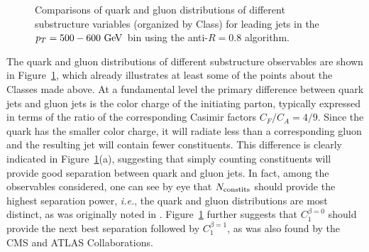 \begin{figure}
\caption{Comparisons of quark and gluon distributions of different substructure variables (organized by Class) for leading jets in the 
$\pt=500-600 \GeV$ bin using the anti-\kT $R=0.8$ algorithm. }
\label{fig:qg_pt500_subst_AKt_R08}
\end{figure}

The quark and gluon distributions of different substructure observables
are shown in Figure~\ref{fig:qg_pt500_subst_AKt_R08}, which already illustrates at least some of the points about the Classes made above. 
At a fundamental level the primary difference between quark jets and gluon jets is the color charge of the initiating parton, typically expressed in terms of the
ratio of the corresponding Casimir factors $C_F/C_A = 4/9$.  Since the quark has the smaller color charge, it will radiate less than a corresponding
gluon and the resulting jet will contain fewer constituents. This difference is clearly indicated in Figure~\ref{fig:qg_pt500_subst_AKt_R08}(a), 
suggesting that simply counting constituents will provide good separation between quark and gluon jets.  In fact, among the observables
considered, one can see by eye that $N_{\rm constits}$ should provide the highest separation
power, \textit{i.e.}, the quark and gluon distributions are most distinct, as was originally noted in . 
Figure~\ref{fig:qg_pt500_subst_AKt_R08} further suggests
that $C_1^{\beta=0}$ should provide the next best separation followed by $C_1^{\beta=1}$, as was also
found by the CMS and ATLAS Collaborations.   

